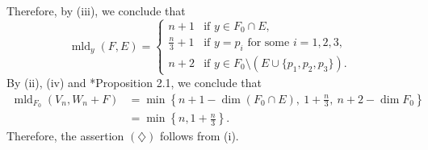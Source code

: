 \documentclass[a4paper,11pt]{amsart}
\theoremstyle{definition}
\theoremstyle{remark}
\begin{document}
Therefore, by (iii), we conclude that
\[
\operatorname{mld}_{y}(F, E) = 
\begin{cases}
n + 1 & \text{if $y \in F_0 \cap E$}, \\
\frac{n}{3} + 1 & \text{if $y = p_i$ for some $i = 1,2,3$}, \\
n+2 & \text{if $y \in F_0 \setminus (E \cup \{ p_1, p_2, p_3 \})$}. \tag{iv}
\end{cases}
\]
By (ii), (iv) and \cite{Amb99}*{Proposition 2.1}, we conclude that
\begin{align*}
\operatorname{mld}_{F_0}(V_n, W_n + F) 
&= \min \left \{ n + 1 - \dim (F_0 \cap E), \ 1 + \frac{n}{3},\ n+2 - \dim F_0 \right \} \\
&= \min \left \{ n, 1 + \frac{n}{3} \right \}. 
\end{align*}
Therefore, the assertion $(\diamondsuit)$ follows from (i). 


\end{document}
